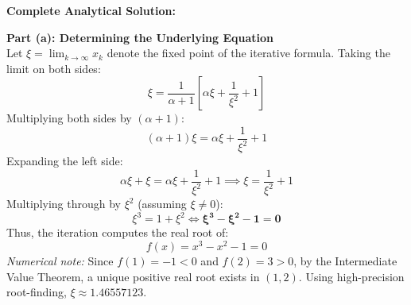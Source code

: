 \documentclass[11pt,a4paper]{article}
\numberwithin{equation}{section}
\begin{document}
\begin{solbox}
\textbf{Complete Analytical Solution:}

\noindent\textbf{Part (a): Determining the Underlying Equation} \\
Let $\xi = \lim_{k\to\infty} x_k$ denote the fixed point of the iterative formula. Taking the limit on both sides:
\begin{equation}
    \xi = \frac{1}{\alpha + 1} \left[ \alpha \xi + \frac{1}{\xi^2} + 1 \right]
\end{equation}
Multiplying both sides by $(\alpha + 1)$:
\begin{equation}
    (\alpha + 1)\xi = \alpha \xi + \frac{1}{\xi^2} + 1
\end{equation}
Expanding the left side:
\begin{equation}
    \alpha \xi + \xi = \alpha \xi + \frac{1}{\xi^2} + 1 \implies \xi = \frac{1}{\xi^2} + 1
\end{equation}
Multiplying through by $\xi^2$ (assuming $\xi \ne 0$):
\begin{equation}
    \xi^3 = 1 + \xi^2 \iff \mathbf{\xi^3 - \xi^2 - 1 = 0}
\end{equation}
Thus, the iteration computes the real root of:
\begin{equation}
    \boxed{f(x) = x^3 - x^2 - 1 = 0}
\end{equation}
\textit{Numerical note:} Since $f(1) = -1 < 0$ and $f(2) = 3 > 0$, by the Intermediate Value Theorem, a unique positive real root exists in $(1, 2)$. Using high-precision root-finding, $\xi \approx 1.46557123$.


\end{solbox}
\end{document}
